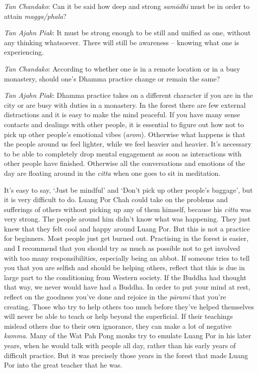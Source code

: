 \emph{Tan Chandako}: Can it be said how deep and strong \emph{samādhi}
must be in order to attain \emph{magga/phala}? 

\emph{Tan Ajahn Piak}: It must be strong enough to be still and unified
as one, without any thinking whatsoever. There will still be awareness
-- knowing what one is experiencing. 

\emph{Tan Chandako}: According to whether one is in a remote location or
in a busy monastery, should one's Dhamma practice change or remain the
same? 

\emph{Tan Ajahn Piak}: Dhamma practice takes on a different character if
you are in the city or are busy with duties in a monastery. In the
forest there are few external distractions and it is easy to make the
mind peaceful. If you have many sense contacts and dealings with other
people, it is essential to figure out how not to pick up other people's
emotional vibes (\emph{arom}). Otherwise what happens is that the people
around us feel lighter, while we feel heavier and heavier. It's
necessary to be able to completely drop mental engagement as soon as
interactions with other people have finished. Otherwise all the
conversations and emotions of the day are floating around in the
\emph{citta} when one goes to sit in meditation. 

It's easy to say, `Just be mindful' and `Don't pick up other people's
baggage', but it is very difficult to do. Luang Por Chah could take on
the problems and sufferings of others without picking up any of them
himself, because his \emph{citta} was very strong. The people around him
didn't know what was happening. They just knew that they felt cool and
happy around Luang Por. But this is not a practice for beginners. Most
people just get burned out. Practising in the forest is easier, and I
recommend that you should try as much as possible not to get involved
with too many responsibilities, especially being an abbot. If someone
tries to tell you that you are selfish and should be helping others, 
reflect that this is due in large part to the conditioning from Western
society. If the Buddha had thought that way, we never would have had a
Buddha. In order to put your mind at rest, reflect on the goodness
you've done and rejoice in the \emph{pāramī} that you're creating. Those
who try to help others too much before they've helped themselves will
never be able to teach or help beyond the superficial. If their
teachings mislead others due to their own ignorance, they can make a lot
of negative \emph{kamma}. Many of the Wat Pah Pong monks try to emulate
Luang Por in his later years, when he would talk with people all day, 
rather than his early years of difficult practice. But it was precisely
those years in the forest that made Luang Por into the great teacher
that he was. 

